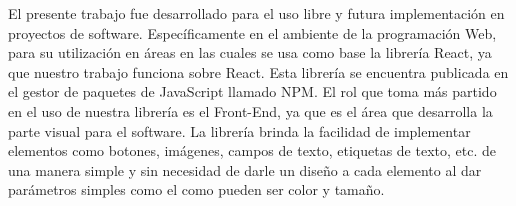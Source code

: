 El presente trabajo fue desarrollado para el uso libre y futura implementación en proyectos de software. Específicamente en el ambiente de la programación Web, para su utilización en áreas en las cuales se usa como base la librería React, ya que nuestro trabajo funciona sobre React.
 \newline
  \newline
Esta librería se encuentra publicada en el gestor de paquetes de JavaScript llamado NPM. 
 \newline
  \newline
El rol que toma más partido en el uso de nuestra librería es el Front-End, ya que es el área que desarrolla la parte visual para el software. La librería brinda la facilidad de implementar elementos como botones, imágenes, campos de texto, etiquetas de texto, etc. de una manera simple y sin necesidad de darle un diseño a cada elemento al dar parámetros simples como el como pueden ser color y tamaño.
